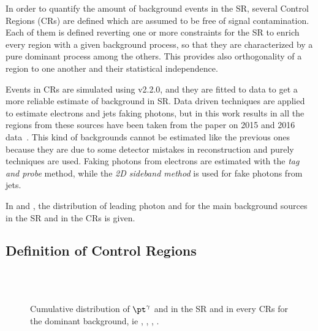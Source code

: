 In order to quantify the amount of background events in the SR, several Control Regions (CRs) are defined which are assumed to be free of signal contamination. Each of them is defined reverting one or more constraints for the SR to enrich every region with a given background process, so that they are characterized by a pure dominant process among the others. This provides also orthogonality of a region to one another and their statistical independence.

Events in CRs are simulated using \SHERPA v2.2.0, and they are fitted to data to get a more reliable estimate of background in SR. Data driven techniques are applied to estimate electrons and jets faking photons, but in this work results in all the regions from these sources have been taken from the \mph paper on 2015 and 2016 data~\cite{paperMP}. This kind of backgrounds cannot be estimated like the previous ones because they are due to some detector mistakes in reconstruction and purely \insitu techniques are used. Faking photons from electrons are estimated with the \emph{tag and probe} method, while the \emph{2D sideband method} is used for fake photons from jets.

In \Fig{\ref{fig:prefit}} and \Fig{\ref{fig:prefitcont}}, the distribution of leading photon \pt and \met for the main background sources in the SR and in the CRs is given.

\subsection{Definition of Control Regions}
\begin{figure}[p]
\centering
{} \quad
{} \\

 \quad
{} \\

\caption{Cumulative distribution of $\pt^{\gamma}$ and \met in the SR and in every CRs for the dominant background, ie \znng, \zg, \wg, \gj.}
\label{fig:prefit}
\end{figure}

